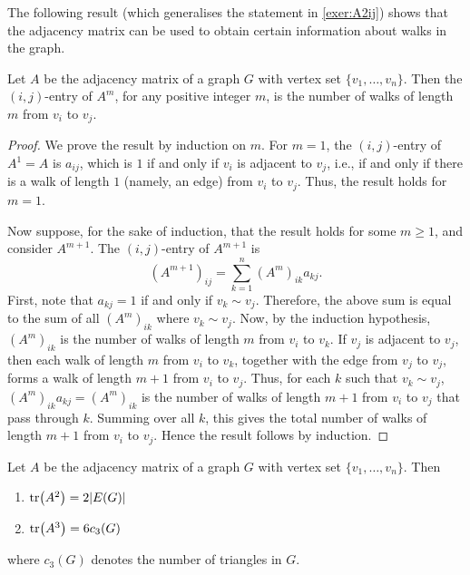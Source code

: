 The following result (which generalises the statement in \cref{exer:A2ij}) shows that the adjacency matrix can be used to obtain certain information about walks in the graph.

\begin{Theorem}
Let $A$ be the adjacency matrix of a graph $G$ with vertex set $\{v_1, \ldots, v_n\}$. Then the $(i,j)$-entry of $A^m$, for any positive integer $m$, is the number of walks of length $m$ from $v_i$ to $v_j$.
\end{Theorem}

\begin{proof}
We prove the result by induction on $m$. For $m = 1$, the $(i,j)$-entry of $A^1 = A$ is $a_{ij}$, which is $1$ if and only if $v_i$ is adjacent to $v_j$, i.e., if and only if there is a walk of length $1$ (namely, an edge) from $v_i$ to $v_j$. Thus, the result holds for $m = 1$.

Now suppose, for the sake of induction, that the result holds for some $m \ge 1$, and consider $A^{m + 1}$. The $(i,j)$-entry of $A^{m + 1}$ is
\begin{equation*}
(A^{m + 1})_{ij} = \sum_{k = 1}^{n} (A^m)_{ik} a_{kj}.
\end{equation*}
First, note that $a_{kj} = 1$ if and only if $v_k \sim v_j$. Therefore, the above sum is equal to the sum of all $(A^m)_{ik}$ where $v_k \sim v_j$. Now, by the induction hypothesis, $(A^m)_{ik}$ is the number of walks of length $m$ from $v_i$ to $v_k$. If $v_j$ is adjacent to $v_j$, then each walk of length $m$ from $v_i$ to $v_k$, together with the edge from $v_j$ to $v_j$, forms a walk of length $m + 1$ from $v_i$ to $v_j$. Thus, for each $k$ such that $v_k \sim v_j$, $(A^m)_{ik} a_{kj} = (A^m)_{ik}$ is the number of walks of length $m + 1$ from $v_i$ to $v_j$ that pass through $k$. Summing over all $k$, this gives the total number of walks of length $m + 1$ from $v_i$ to $v_j$. Hence the result follows by induction.
\end{proof}

\begin{Theorem}
Let $A$ be the adjacency matrix of a graph $G$ with vertex set $\{v_1, \ldots, v_n\}$. Then
\begin{enumerate}[label=(\roman*)]
\item $\tr(A^2) = 2 |E(G)|$
\item $\tr(A^3) = 6 c_3(G)$
\end{enumerate}
where $c_3(G)$ denotes the number of triangles in $G$.
\end{Theorem}


